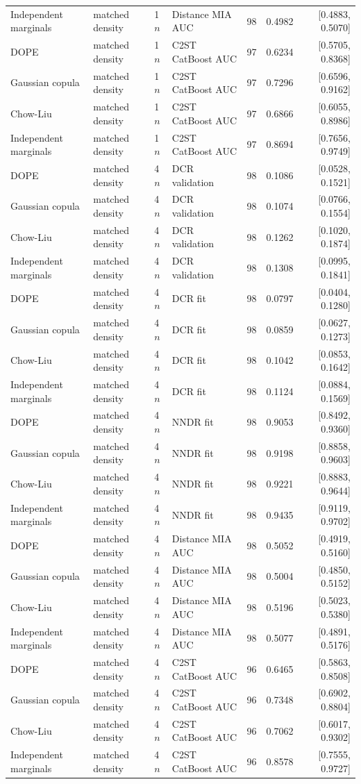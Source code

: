 \begin{longtable}{lllllrr}
Independent marginals & matched density & 1$n$ & Distance MIA AUC & 98 & 0.4982 & [0.4883, 0.5070] \\
DOPE & matched density & 1$n$ & C2ST CatBoost AUC & 97 & 0.6234 & [0.5705, 0.8368] \\
Gaussian copula & matched density & 1$n$ & C2ST CatBoost AUC & 97 & 0.7296 & [0.6596, 0.9162] \\
Chow-Liu & matched density & 1$n$ & C2ST CatBoost AUC & 97 & 0.6866 & [0.6055, 0.8986] \\
Independent marginals & matched density & 1$n$ & C2ST CatBoost AUC & 97 & 0.8694 & [0.7656, 0.9749] \\
DOPE & matched density & 4$n$ & DCR validation & 98 & 0.1086 & [0.0528, 0.1521] \\
Gaussian copula & matched density & 4$n$ & DCR validation & 98 & 0.1074 & [0.0766, 0.1554] \\
Chow-Liu & matched density & 4$n$ & DCR validation & 98 & 0.1262 & [0.1020, 0.1874] \\
Independent marginals & matched density & 4$n$ & DCR validation & 98 & 0.1308 & [0.0995, 0.1841] \\
DOPE & matched density & 4$n$ & DCR fit & 98 & 0.0797 & [0.0404, 0.1280] \\
Gaussian copula & matched density & 4$n$ & DCR fit & 98 & 0.0859 & [0.0627, 0.1273] \\
Chow-Liu & matched density & 4$n$ & DCR fit & 98 & 0.1042 & [0.0853, 0.1642] \\
Independent marginals & matched density & 4$n$ & DCR fit & 98 & 0.1124 & [0.0884, 0.1569] \\
DOPE & matched density & 4$n$ & NNDR fit & 98 & 0.9053 & [0.8492, 0.9360] \\
Gaussian copula & matched density & 4$n$ & NNDR fit & 98 & 0.9198 & [0.8858, 0.9603] \\
Chow-Liu & matched density & 4$n$ & NNDR fit & 98 & 0.9221 & [0.8883, 0.9644] \\
Independent marginals & matched density & 4$n$ & NNDR fit & 98 & 0.9435 & [0.9119, 0.9702] \\
DOPE & matched density & 4$n$ & Distance MIA AUC & 98 & 0.5052 & [0.4919, 0.5160] \\
Gaussian copula & matched density & 4$n$ & Distance MIA AUC & 98 & 0.5004 & [0.4850, 0.5152] \\
Chow-Liu & matched density & 4$n$ & Distance MIA AUC & 98 & 0.5196 & [0.5023, 0.5380] \\
Independent marginals & matched density & 4$n$ & Distance MIA AUC & 98 & 0.5077 & [0.4891, 0.5176] \\
DOPE & matched density & 4$n$ & C2ST CatBoost AUC & 96 & 0.6465 & [0.5863, 0.8508] \\
Gaussian copula & matched density & 4$n$ & C2ST CatBoost AUC & 96 & 0.7348 & [0.6902, 0.8804] \\
Chow-Liu & matched density & 4$n$ & C2ST CatBoost AUC & 96 & 0.7062 & [0.6017, 0.9302] \\
Independent marginals & matched density & 4$n$ & C2ST CatBoost AUC & 96 & 0.8578 & [0.7555, 0.9727] \\
\bottomrule
\end{longtable}
